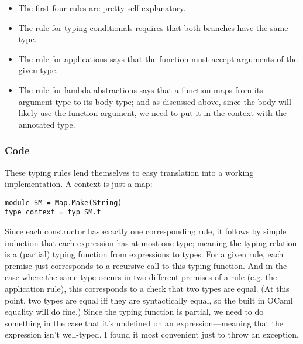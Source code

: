\documentclass[pageno]{jpaper}
\begin{document}
{\begin{prooftree}
\end{prooftree}

\begin{prooftree}
\end{prooftree}

\begin{itemize}
\item The first four rules are pretty self explanatory.
\item The rule for typing conditionals requires that both branches have the same type.
\item The rule for applications says that the function must accept arguments of the given type.
\item The rule for lambda abstractions says that a function maps from its argument type to its body type; and
as discussed above, since the body will likely use the function argument, we need to put it
in the context with the annotated type.
\end{itemize}

\subsubsection{Code}
These typing rules lend themselves to
easy translation into a working implementation. A context is just a map:
\begin{lstlisting}
module SM = Map.Make(String)
type context = typ SM.t
\end{lstlisting}

Since each constructor has exactly one corresponding rule, it follows by simple induction that
each expression has at most one type; meaning the typing relation is a (partial) typing function from expressions
to types. For a given rule, each premise just corresponds to a recursive call to this typing
function. And in the case where the same type occurs in two different premises of a rule (e.g. the application rule), this corresponds to a check that two types are equal. (At this point, two types are equal iff they are
syntactically equal, so the built in OCaml equality will do fine.)
Since the typing function is partial, we need to do something in the case that it's undefined on
an expression---meaning that the expression isn't well-typed.  I found it most convenient just to throw an
exception.

}
\end{document}
